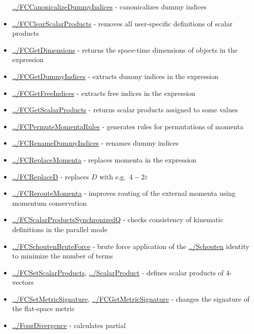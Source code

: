 \documentclass[../FeynCalcManual.tex]{subfiles}
\begin{document}
\begin{itemize}
  \hyperlink{../fccanonicalizedummyindices}{../FCCanonicalizeDummyIndices}
  - canonicalizes dummy indices
\item
  \hyperlink{../fcclearscalarproducts}{../FCClearScalarProducts} -
  removes all user-specific definitions of scalar products
\item
  \hyperlink{../fcgetdimensions}{../FCGetDimensions} - returns the
  space-time dimensions of objects in the expression
\item
  \hyperlink{../fcgetdummyindices}{../FCGetDummyIndices} - extracts
  dummy indices in the expression
\item
  \hyperlink{../fcgetfreeindices}{../FCGetFreeIndices} - extracts free
  indices in the expression
\item
  \hyperlink{../fcgetscalarproducts}{../FCGetScalarProducts} - returns
  scalar products assigned to some values
\item
  \hyperlink{../fcpermutemomentarules}{../FCPermuteMomentaRules} -
  generates rules for permutations of momenta
\item
  \hyperlink{../fcrenamedummyindices}{../FCRenameDummyIndices} - renames
  dummy indices
\item
  \hyperlink{../fcreplacemomenta}{../FCReplaceMomenta} - replaces
  momenta in the expression
\item
  \hyperlink{../fcreplaced}{../FCReplaceD} - replaces \(D\) with
  e.g.~\(4-2 \varepsilon\)
\item
  \hyperlink{../fcreroutemomenta}{../FCRerouteMomenta} - improves
  routing of the external momenta using momentum conservation
\item
  \hyperlink{../fcscalarproductssynchronizedq}{../FCScalarProductsSynchronizedQ}
  - checks consistency of kinematic definitions in the parallel mode
\item
  \hyperlink{../fcschoutenbruteforce}{../FCSchoutenBruteForce} - brute
  force application of the \hyperlink{../schouten}{../Schouten} identity
  to minimize the number of terms
\item
  \hyperlink{../fcsetscalarproducts}{../FCSetScalarProducts},
  \hyperlink{../scalarproduct}{../ScalarProduct} - defines scalar
  products of \(4\)-vectors
\item
  \hyperlink{../fcsetmetricsignature}{../FCSetMetricSignature},
  \hyperlink{../fcgetmetricsignature}{../FCGetMetricSignature} - changes
  the signature of the flat-space metric
\item
  \hyperlink{../fourdivergence}{../FourDivergence} - calculates partial

\end{itemize}
\end{document}
